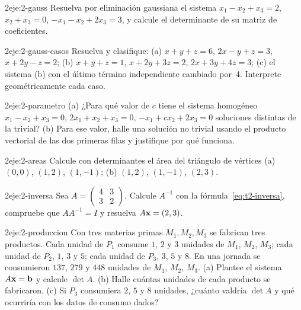 \begin{ejercicio}{2}{eje:2-gauss}
Resuelva por eliminación gaussiana el sistema $x_1-x_2+x_3=2$, $x_2+x_3=0$, $-x_1-x_2+2x_3=3$, y calcule el determinante de su matriz de coeficientes.
\end{ejercicio}

\begin{ejercicio}{2}{eje:2-gauss-casos}
Resuelva y clasifique: (a) $x+y+z=6$, $2x-y+z=3$, $x+2y-z=2$; (b) $x+y+z=1$, $x+2y+3z=2$, $2x+3y+4z=3$; (c) el sistema (b) con el último término independiente cambiado por~4. Interprete geométricamente cada caso.
\end{ejercicio}

\begin{ejercicio}{2}{eje:2-parametro}
(a) ¿Para qué valor de $c$ tiene el sistema homogéneo $x_1-x_2+x_3=0$, $2x_1+x_2+x_3=0$, $-x_1+cx_2+2x_3=0$ soluciones distintas de la trivial? (b) Para ese valor, halle una solución no trivial usando el producto vectorial de las dos primeras filas y justifique por qué funciona.
\end{ejercicio}

\begin{ejercicio}{2}{eje:2-areas}
Calcule con determinantes el área del triángulo de vértices (a) $(0,0)$, $(1,2)$, $(1,-1)$; (b) $(1,2)$, $(1,-1)$, $(2,3)$.
\end{ejercicio}

\begin{ejercicio}{2}{eje:2-inversa}
Sea $A=\begin{pmatrix}4&3\\3&2\end{pmatrix}$. Calcule $A^{-1}$ con la fórmula~\eqref{eq:t2-inversa}, compruebe que $AA^{-1}=I$ y resuelva $A\mathbf{x}=(2,3)$.
\end{ejercicio}

\begin{ejercicio}{2}{eje:2-produccion}
Con tres materias primas $M_1,M_2,M_3$ se fabrican tres productos. Cada unidad de $P_1$ consume $1$, $2$ y $3$ unidades de $M_1$, $M_2$, $M_3$; cada unidad de $P_2$, $1$, $3$ y $5$; cada unidad de $P_3$, $3$, $5$ y $8$. En una jornada se consumieron $137$, $279$ y $448$ unidades de $M_1$, $M_2$, $M_3$. (a) Plantee el sistema $A\mathbf{x}=\mathbf{b}$ y calcule $\det A$. (b) Halle cuántas unidades de cada producto se fabricaron. (c) Si $P_3$ consumiera $2$, $5$ y $8$ unidades, ¿cuánto valdría $\det A$ y qué ocurriría con los datos de consumo dados?
\end{ejercicio}

